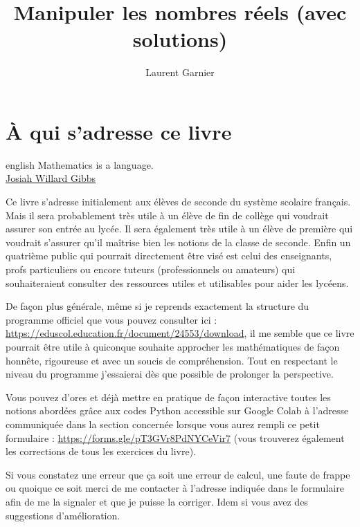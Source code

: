 \documentclass[a4paper, 11pt, twoside]{article}
\author{Laurent Garnier}
\date{}
\title{Manipuler les nombres réels (avec solutions)}
\begin{document}
\maketitle
\tableofcontents



\section{À qui s'adresse ce livre}
\label{sec:org4ba1ec4}
\begin{foreigndisplayquote}{english}
Mathematics is a language.\\

\href{https://en.wikipedia.org/wiki/Josiah\_Willard\_Gibbs}{Josiah Willard Gibbs}
\end{foreigndisplayquote}

Ce livre s'adresse initialement aux élèves de seconde du système
scolaire français. Mais il sera probablement très utile à un élève
de fin de collège qui voudrait assurer son entrée au lycée. Il sera
également très utile à un élève de première qui voudrait s'assurer
qu'il maîtrise bien les notions de la classe de seconde. Enfin un
quatrième public qui pourrait directement être visé est celui des
enseignants, profs particuliers ou encore tuteurs (professionnels ou
amateurs) qui souhaiteraient consulter des ressources utiles et
utilisables pour aider les lycéens.

De façon plus générale, même si je reprends exactement la structure
du programme officiel que vous pouvez consulter ici :
\url{https://eduscol.education.fr/document/24553/download}, il me semble
que ce livre pourrait être utile à quiconque souhaite approcher les
mathématiques de façon honnête, rigoureuse et avec un soucis de
compréhension. Tout en respectant le niveau du programme j'essaierai
dès que possible de prolonger la perspective.

Vous pouvez d'ores et déjà mettre en pratique de façon interactive
toutes les notions abordées grâce aux codes Python accessible sur
Google Colab à l'adresse communiquée dans la section concernée
lorsque vous aurez rempli ce petit formulaire :
\url{https://forms.gle/pT3GVr8PdNYCeVir7} (vous trouverez également les
corrections de tous les exercices du livre).

Si vous constatez une erreur que ça soit une erreur de calcul, une
faute de frappe ou quoique ce soit merci de me contacter à l'adresse
indiquée dans le formulaire afin de me la signaler et que je puisse
la corriger. Idem si vous avez des suggestions d'amélioration.
\end{document}
